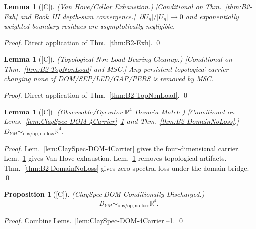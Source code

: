 \documentclass[12pt,oneside]{amsbook}
\theoremstyle{plain}
\newtheorem{lemma}[theorem]{Lemma}
\newtheorem{proposition}[theorem]{Proposition}
\theoremstyle{definition}
\theoremstyle{remark}
\newcommand{\status}[1]{\textup{[#1]}}
\begin{document}
\begin{lemma}[\status{C}]\label{lem:ClaySpec-DOM-exhaustion}
\textup{(Van Hove/Collar Exhaustion.)}
\textup{[Conditional on Thm.~\ref{thm:B2-Exh} and Book~III
depth-sum convergence.]}
$|\partial U_n|/|U_n|\to0$ and exponentially weighted boundary
residues are asymptotically negligible.
\end{lemma}

\begin{proof}
Direct application of Thm.~\ref{thm:B2-Exh}.
\qed
\end{proof}

\begin{lemma}[\status{C}]\label{lem:ClaySpec-DOM-top-clean}
\textup{(Topological Non-Load-Bearing Cleanup.)}
\textup{[Conditional on Thm.~\ref{thm:B2-TopNonLoad} and MSC.]}
Any persistent topological carrier changing none of DOM/SEP/LED/GAP/PERS
is removed by MSC.
\end{lemma}

\begin{proof}
Direct application of Thm.~\ref{thm:B2-TopNonLoad}.
\qed
\end{proof}

\begin{lemma}[\status{C}]\label{lem:ClaySpec-DOM-R4Quotient}
\textup{(Observable/Operator $\mathbb{R}^4$ Domain Match.)}
\textup{[Conditional on Lems.~\ref{lem:ClaySpec-DOM-4Carrier}--\ref{lem:ClaySpec-DOM-top-clean}
and Thm.~\ref{thm:B2-DomainNoLoss}.]}
$D_{YM}\sim_{\mathrm{obs/op,no\text{-}loss}}\mathbb{R}^4$.
\end{lemma}

\begin{proof}
Lem.~\ref{lem:ClaySpec-DOM-4Carrier} gives the four-dimensional carrier.
Lem.~\ref{lem:ClaySpec-DOM-exhaustion} gives Van Hove exhaustion.
Lem.~\ref{lem:ClaySpec-DOM-top-clean} removes topological artifacts.
Thm.~\ref{thm:B2-DomainNoLoss} gives zero spectral loss under the
domain bridge.
\qed
\end{proof}

\begin{proposition}[\status{C}]\label{prop:ClaySpec-DOM}
\textup{(ClaySpec-DOM Conditionally Discharged.)}
\[
 \boxed{D_{YM}\sim_{\mathrm{obs/op,no\text{-}loss}}\mathbb{R}^4.}
\]
\end{proposition}

\begin{proof}
Combine Lems.~\ref{lem:ClaySpec-DOM-4Carrier}--\ref{lem:ClaySpec-DOM-R4Quotient}.
\qed
\end{proof}
\end{document}
